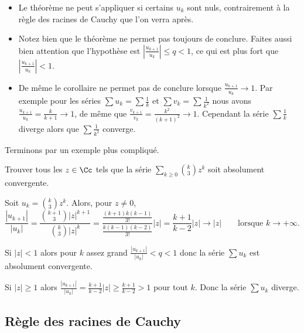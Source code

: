 \documentclass[class=report,crop=false]{standalone}
\begin{document}
\begin{remarque*}
\begin{itemize}
  \item Le théorème ne peut s'appliquer si certains $u_k$ sont nuls,
  contrairement à la règle des racines de Cauchy que l'on verra après.
  
  \item Notez bien que le théorème ne permet pas toujours de conclure.
  Faites aussi bien attention que l'hypothèse est 
  $\left|\frac{u_{k+1}}{u_k}\right| \le q <1$, ce qui est plus fort que
  $\left|\frac{u_{k+1}}{u_k}\right| <1$.
  
  \item De même le corollaire ne permet pas de conclure lorsque $\frac{u_{k+1}}{u_k} \to 1$.
  Par exemple pour les séries $\sum u_k= \sum \frac{1}{k}$ 
  et $\sum v_k = \sum \frac{1}{k^2}$ 
  nous avons $\frac{u_{k+1}}{u_k} = \frac{k}{k+1} \to 1$,
  de même que $\frac{v_{k+1}}{v_k} = \frac{k^2}{(k+1)^2 } \to 1$.
  Cependant la série $\sum \frac{1}{k}$ diverge 
  alors que $\sum \frac{1}{k^2}$ converge.
\end{itemize}
\end{remarque*}

Terminons par un exemple plus compliqué.

\begin{exemple}
Trouver tous les $z\in \Cc$ tels que la série 
$\sum_{k\ge0} \binom{k}{3} z^k$ soit absolument convergente.
\medskip

Soit $u_k=\binom{k}{3} z^k$. Alors, pour $z\neq0$,
$$\frac{|u_{k+1}|}{|u_k|}=\frac{\binom{k+1}{3}|z|^{k+1}}{\binom{k}{3}|z|^{k}}=
\frac{\frac{(k+1)k(k-1)}{3!}}{\frac{k(k-1)(k-2)}{3!}}|z|
=\frac{k+1}{k-2}|z|\to |z| \qquad \text{lorsque } k\to+\infty.$$ 


Si $|z|<1$ alors pour $k$ assez grand $\frac{|u_{k+1}|}{|u_k|} < q <1$
donc la série $\sum u_k$ est absolument convergente.

Si $|z|\ge 1$ alors $\frac{|u_{k+1}|}{|u_k|}=\frac{k+1}{k-2}|z|\ge \frac{k+1}{k-2}> 1$
pour tout $k$. Donc la série $\sum u_k$  diverge.

\end{exemple}


\subsection{Règle des racines de Cauchy}
\end{document}
